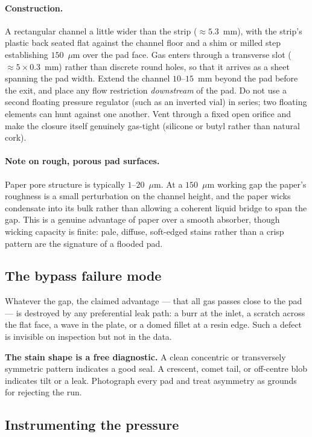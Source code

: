 \documentclass[11pt,a4paper]{article}
\newcommand{\um}{\ensuremath{\mu\mathrm{m}}}
\begin{document}
\paragraph{Construction.} A rectangular channel a little wider than the
strip ($\approx 5.3$~mm), with the strip's plastic back seated flat against
the channel floor and a shim or milled step establishing $150$~\um{} over
the pad face. Gas enters through a transverse slot ($\approx 5 \times
0.3$~mm) rather than discrete round holes, so that it arrives as a sheet
spanning the pad width. Extend the channel $10$--$15$~mm beyond the pad
before the exit, and place any flow restriction \emph{downstream} of the
pad. Do not use a second floating pressure regulator (such as an inverted
vial) in series; two floating elements can hunt against one another. Vent
through a fixed open orifice and make the closure itself genuinely
gas-tight (silicone or butyl rather than natural cork).

\paragraph{Note on rough, porous pad surfaces.} Paper pore structure is
typically $1$--$20$~\um{}. At a $150$~\um{} working gap the paper's
roughness is a small perturbation on the channel height, and the paper wicks
condensate into its bulk rather than allowing a coherent liquid bridge to
span the gap. This is a genuine advantage of paper over a smooth absorber,
though wicking capacity is finite: pale, diffuse, soft-edged stains rather
than a crisp pattern are the signature of a flooded pad.

\subsection{The bypass failure mode}

Whatever the gap, the claimed advantage --- that all gas passes close to the
pad --- is destroyed by any preferential leak path: a burr at the inlet, a
scratch across the flat face, a wave in the plate, or a domed fillet at a
resin edge. Such a defect is invisible on inspection but not in the data.

\textbf{The stain shape is a free diagnostic.} A clean concentric or
transversely symmetric pattern indicates a good seal. A crescent, comet
tail, or off-centre blob indicates tilt or a leak. Photograph every pad and
treat asymmetry as grounds for rejecting the run.

\subsection{Instrumenting the pressure}
\end{document}
